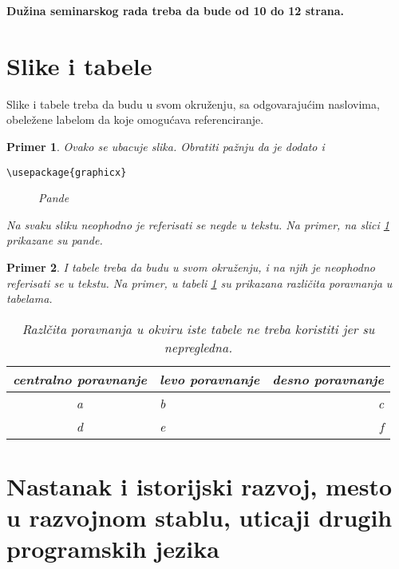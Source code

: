 \documentclass[a4paper]{article}
\newtheorem{primer}{Primer}[section]
\begin{document}
\textbf{Dužina seminarskog rada treba da bude od 10 do 12 strana.}

\section{Slike i tabele}
\label{slike_i_tabele}

Slike i tabele treba da budu u svom okruženju, sa odgovarajućim naslovima, obeležene labelom da koje omogućava referenciranje. 

\begin{primer} Ovako se ubacuje slika. Obratiti pažnju da je dodato i 
\begin{verbatim}
\usepackage{graphicx}
\end{verbatim}

\begin{figure}[h!]
\begin{center}
\end{center}
\caption{Pande}
\label{fig:pande}
\end{figure}

Na svaku sliku neophodno je referisati se negde u tekstu. Na primer, na slici \ref{fig:pande} prikazane su pande. 
\end{primer}

\begin{primer} I tabele treba da budu u svom okruženju, i na njih je neophodno referisati se u tekstu. Na primer, u tabeli \ref{tab:tabela1} su prikazana različita poravnanja u tabelama.

\begin{table}[h!]
\begin{center}
\caption{Razlčita poravnanja u okviru iste tabele ne treba koristiti jer su nepregledna.}
\begin{tabular}{|c|l|r|} \hline
centralno poravnanje& levo poravnanje& desno poravnanje\\ \hline
a &b&c\\ \hline
d &e&f\\ \hline
\end{tabular}
\label{tab:tabela1}
\end{center}
\end{table}

\end{primer}

\section{Nastanak i istorijski razvoj, mesto u razvojnom stablu, uticaji drugih programskih jezika}
\label{sec:osnovno}
\end{document}
